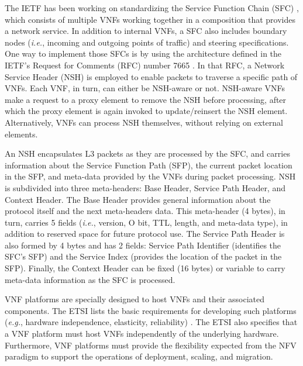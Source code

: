 The IETF has been working on standardizing the Service Function Chain (SFC) \cite{Joel-2015}, which consists of multiple VNFs working together in a composition that provides a network service. In addition to internal VNFs, a SFC also includes boundary nodes (\textit{i.e.},  incoming and outgoing points of traffic) and steering specifications. One way to implement those SFCs is by using the architecture defined in the IETF's Request for Comments (RFC) number 7665 \cite{Joel-2015}. In that RFC, a Network Service Header (NSH) \cite{Quinn-2018} is employed to enable packets to traverse a specific path of VNFs. Each VNF, in turn, can either be NSH-aware or not. NSH-aware VNFs make a request to a proxy element to remove the NSH before processing, after which the proxy element is again invoked to update/reinsert the NSH element. Alternatively, VNFs can process NSH themselves, without relying on external elements.

An NSH encapsulates L3 packets as they are processed by the SFC, and carries information about the Service Function Path (SFP), the current packet location in the SFP, and meta-data provided by the VNFs during packet processing.  NSH is subdivided into three meta-headers: Base Header, Service Path Header, and Context Header. The Base Header provides general information about the protocol itself and the next meta-headers data. This meta-header (4 bytes), in turn, carries 5 fields (\textit{i.e.}, version, O bit, TTL, length, and meta-data type), in addition to reserved space for future protocol use. The Service Path Header is also formed by 4 bytes and has 2 fields: Service Path Identifier (identifies the SFC's SFP) and the Service Index (provides the location of the packet in the SFP). Finally, the Context Header can be fixed (16 bytes) or variable to carry meta-data information as the SFC is processed.


VNF platforms are specially designed to host VNFs and their associated components. The ETSI lists the basic requirements for developing such platforms (\textit{e.g.}, hardware independence, elasticity, reliability) \cite{SWA-2014}. The ETSI also specifies that a VNF platform must host VNFs independently of the underlying hardware. Furthermore, VNF platforms must provide the flexibility expected from the NFV paradigm to support the operations of deployment, scaling, and migration.


